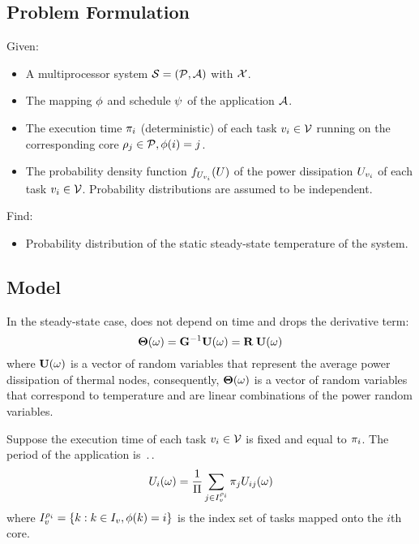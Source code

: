 \subsection{Problem Formulation}
Given:
\begin{itemize}
  \item A multiprocessor system $\mathcal{S} = (\mathcal{P}, \mathcal{A})$ with $\mathcal{X}$.
  \item The mapping $\phi$ and schedule $\psi$ of the application $\mathcal{A}$.
  \item The execution time $\pi_i$ (deterministic) of each task $v_i \in \mathcal{V}$ running on the corresponding core $\rho_j \in \mathcal{P}, \phi(i) = j$.
  \item The probability density function $f_{U_{v_i}}(U)$ of the power dissipation $U_{v_i}$ of each task $v_i \in \mathcal{V}$. Probability distributions are assumed to be independent.
\end{itemize}

Find:
\begin{itemize}
  \item Probability distribution of the static steady-state temperature of the system.
\end{itemize}

\subsection{Model}
In the steady-state case,  does not depend on time and drops the derivative term:
\[
  \mathbf{\Theta}(\omega) = \mathbf{G}^{-1} \mathbf{U}(\omega) = \mathbf{R} \: \mathbf{U}(\omega)
\]
where $\mathbf{U}(\omega)$ is a vector of random variables that represent the average power dissipation of thermal nodes, consequently, $\mathbf{\Theta}(\omega)$ is a vector of random variables that correspond to temperature and are linear combinations of the power random variables.

Suppose the execution time of each task $v_i \in \mathcal{V}$ is fixed and equal to $\pi_i$. The period of the application is $\period$.
\[
U_i(\omega) = \frac{1}{\Pi} \sum_{j \in I_v^{\rho_i}} \pi_j U_{ij}(\omega)
\]
where $I_v^{\rho_i} = \{ k: k \in I_v, \phi(k) = i \}$ is the index set of tasks mapped onto the $i$th core.
